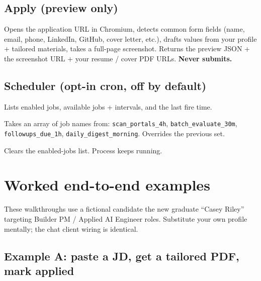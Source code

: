 \documentclass[11pt,letterpaper]{article}
\newcommand{\tool}[1]{\texttt{#1}}
\begin{document}
\subsection*{Apply (preview only)}

\begin{description}[leftmargin=0pt]
\item[\tool{apply\_prefill}] Opens the application URL in Chromium, detects common form fields (name, email, phone, LinkedIn, GitHub, cover letter, etc.), drafts values from your profile + tailored materials, takes a full-page screenshot. Returns the preview JSON + the screenshot URL + your resume / cover PDF URLs. \textbf{Never submits.}
\end{description}

\subsection*{Scheduler (opt-in cron, off by default)}

\begin{description}[leftmargin=0pt]
\item[\tool{scheduler\_status}] Lists enabled jobs, available jobs + intervals, and the last fire time.
\item[\tool{scheduler\_enable}] Takes an array of job names from: \tool{scan\_portals\_4h}, \tool{batch\_evaluate\_30m}, \tool{followups\_due\_1h}, \tool{daily\_digest\_morning}. Overrides the previous set.
\item[\tool{scheduler\_disable}] Clears the enabled-jobs list. Process keeps running.
\end{description}

\section{Worked end-to-end examples}\label{sec:examples}

These walkthroughs use a fictional candidate \textemdash{} the new graduate ``Casey Riley'' targeting Builder PM / Applied AI Engineer roles. Substitute your own profile mentally; the chat client wiring is identical.

\subsection{Example A: paste a JD, get a tailored PDF, mark applied}\label{ex:a}
\end{document}
